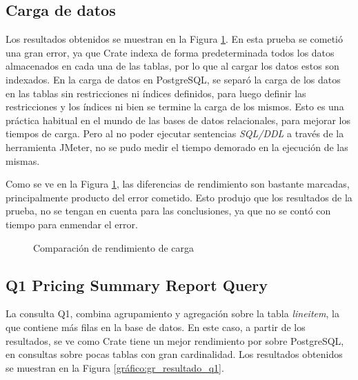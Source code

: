 \documentclass[11pt, twocolumns]{article}
\begin{document}
\begin{multicols}{2}
\subsection{Carga de datos}
Los resultados obtenidos se muestran en la Figura \ref{gráfico:gr_resultado_carga}. En esta prueba se cometió una gran error, ya que Crate indexa de forma predeterminada todos los datos almacenados en cada una de las tablas, por lo que al cargar los datos estos son indexados. En la carga de datos en PostgreSQL, se separó la carga de los datos en las tablas sin restricciones ni índices definidos, para luego definir las restricciones y los índices ni bien se termine la carga de los mismos. Esto es una práctica habitual en el mundo de las bases de datos relacionales, para mejorar los tiempos de carga. Pero al no poder ejecutar sentencias \textit{SQL/DDL} a través de la herramienta JMeter, no se pudo medir el tiempo demorado en la ejecución de las mismas.
\par
Como se ve en la Figura \ref{gráfico:gr_resultado_carga}, las diferencias de rendimiento son bastante marcadas, principalmente producto del error cometido. Esto produjo que los resultados de la prueba, no se tengan en cuenta para las conclusiones, ya que no se contó con tiempo para enmendar el error.

\begin{figure}[H]
    \caption{Comparación de rendimiento de carga}
	\label{gráfico:gr_resultado_carga}
\end{figure}


\subsection{Q1 Pricing Summary Report Query}
La consulta Q1, combina agrupamiento y agregación sobre la tabla \textit{lineitem}, la que contiene más filas en la base de datos. En este caso, a partir de los resultados, se ve como Crate tiene un mejor rendimiento por sobre PostgreSQL, en consultas sobre pocas tablas con gran cardinalidad.
Los resultados obtenidos se muestran en la Figura \ref{gráfico:gr_resultado_q1}.


\end{multicols}
\end{document}
